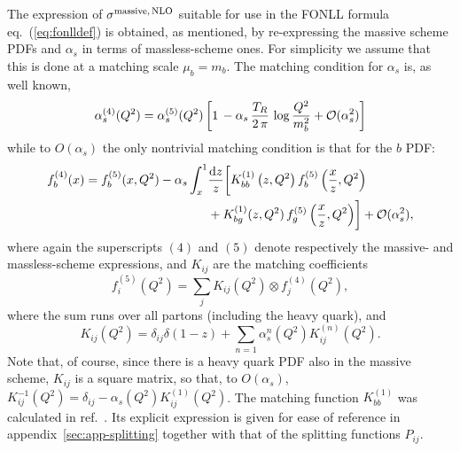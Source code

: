 The expression of $\sigma^{\rm massive,\,NLO}$ suitable for use in the
FONLL formula eq.~(\ref{eq:fonlldef}) is obtained, as mentioned, by
  re-expressing the massive scheme PDFs  and $\alpha_s$ in terms of massless-scheme
  ones. For simplicity we assume that this is done at a matching scale
  $\mu_b=m_b$.
  The matching condition for $\alpha_s$ is, as well known,
\begin{equation} \label{eq:amatch}
  \alpha_s^{(4)}(Q^2) = \alpha^{(5)}_s(Q^2)\left[1\,-\alpha_s\,\frac{T_R}{2\,\pi}\,\log\frac{Q^2}{m_b^2} + {\cal O}(\alpha_s^2)\right]
\end{equation}
while to $O(\alpha_s)$ the only nontrivial matching condition is
that for the $b$ PDF:
\begin{equation}
  \label{eq:b-pdf}
  \begin{split}
  f_b^{(4)}(x) = f^{(5)}_b(x,Q^2) - \alpha_s\int_x^1& \frac{{\rm d}{z}}{z}
  \biggl[ K_{bb}^{(1)}\left(z,Q^2\right)f^{(5)}_b\left(\frac{x}{z},Q^2\right) \\
   &+ K_{bg}^{(1)}(z,Q^2)\,f_g^{(5)}\left(\frac{x}{z},Q^2\right)\biggr]+ {\cal O}(\alpha_s^2),
  \end{split}
\end{equation}
where again the superscripts $(4)$ and  $(5)$  denote  respectively the massive-
and massless-scheme expressions, and $K_{ij}$ are the matching
coefficients
\begin{equation}\label{eq:matching}
  f_i^{(5)}(Q^2) = \sum_j K_{ij}(Q^2) \otimes f^{(4)}_j(Q^2),
\end{equation}
where the sum runs over all partons (including the heavy quark),
and
\begin{equation}\label{eq:kexp}
  K_{ij}(Q^2)=\delta_{ij}\delta(1-z)+\sum_{n=1}\alpha^n_s(Q^2) K_{ij}^{(n)}(Q^2).
\end{equation}
Note
that, of course, since there is a heavy quark PDF also in the massive
scheme, $K_{ij}$ is a square matrix, so that, to $O(\alpha_s)$,
$  K^{-1}_{ij}(Q^2)=\delta_{ij}-\alpha_s(Q^2) K_{ij}^{(1)}(Q^2)$.
The matching function 
 $K^{(1)}_{bb}$ was calculated in ref.~\cite{Buza:1996wv}. Its explicit
expression is given for ease of reference in appendix~\ref{sec:app-splitting} together with
that of the splitting functions
$P_{ij}$. 

